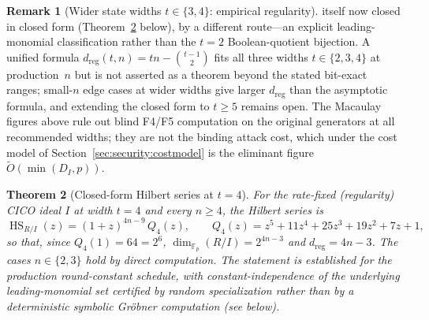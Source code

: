 \documentclass[11pt,a4paper]{article}
\newtheorem{theorem}{Theorem}[section]
\theoremstyle{definition}
\newtheorem{remark}[theorem]{Remark}
\newcommand{\F}{\mathbb{F}}
\begin{document}
\begin{remark}[Wider state widths $t \in \{3, 4\}$: empirical regularity]
itself now closed in closed form (Theorem~\ref{thm:t4_hilb} below),
by a different route---an explicit leading-monomial classification
rather than the $t = 2$ Boolean-quotient bijection. A unified formula
$d_{\mathrm{reg}}(t, n) = tn - \binom{t-1}{2}$ fits all three widths
$t \in \{2, 3, 4\}$ at production~$n$ but is not asserted as a theorem
beyond the stated bit-exact ranges; small-$n$ edge cases at wider
widths give larger $d_{\mathrm{reg}}$ than the asymptotic formula, and
extending the closed form to $t \ge 5$ remains open. The Macaulay
figures above rule out blind F4/F5 computation on the original
generators at all recommended widths; they are not the binding attack
cost, which under the cost model of
Section~\ref{sec:security:costmodel} is the eliminant figure
$\widetilde{O}(\min(D_I, p))$.
\end{remark}

\begin{theorem}[Closed-form Hilbert series at $t = 4$]\label{thm:t4_hilb}
For the rate-fixed (regularity) CICO ideal $I$ at width $t = 4$ and
every $n \ge 4$, the Hilbert series is
\[
  \operatorname{HS}_{R/I}(z) = (1 + z)^{4n - 9}\, Q_4(z),
  \qquad
  Q_4(z) = z^5 + 11 z^4 + 25 z^3 + 19 z^2 + 7 z + 1,
\]
so that, since $Q_4(1) = 64 = 2^6$, $\dim_{\F_p}(R/I) = 2^{4n - 3}$ and
$d_{\mathrm{reg}} = 4n - 3$. The cases $n \in \{2, 3\}$ hold by direct
computation. The statement is established for the production
round-constant schedule, with constant-independence of the underlying
leading-monomial set certified by random specialization rather than by
a deterministic symbolic Gr\"obner computation (see below).
\end{theorem}
\end{document}

